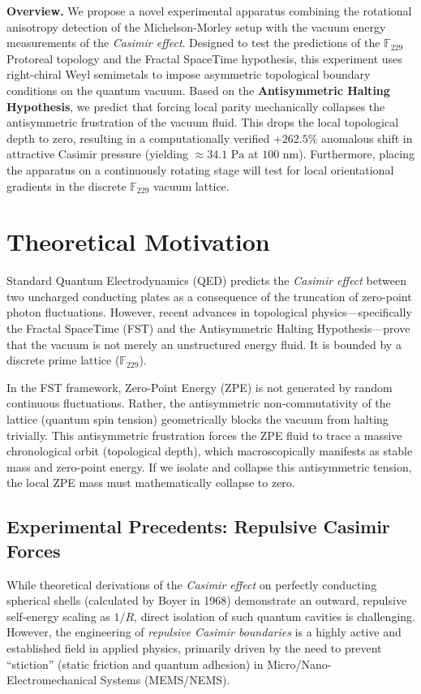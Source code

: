 \documentclass[12pt,oneside]{article}
\theoremstyle{principia}
\theoremstyle{definition}
\theoremstyle{remark}
\begin{document}
\vspace{1em}\noindent\textbf{Overview.}
We propose a novel experimental apparatus combining the rotational anisotropy detection of the Michelson-Morley setup with the vacuum energy measurements of the \emph{Casimir effect}. Designed to test the predictions of the $\mathbb{F}_{229}$ Protoreal topology and the Fractal SpaceTime hypothesis, this experiment uses right-chiral Weyl semimetals to impose asymmetric topological boundary conditions on the quantum vacuum. Based on the \textbf{Antisymmetric Halting Hypothesis}, we predict that forcing local parity mechanically collapses the antisymmetric frustration of the vacuum fluid. This drops the local topological depth to zero, resulting in a computationally verified $+262.5\%$ anomalous shift in attractive Casimir pressure (yielding $\approx 34.1\text{ Pa}$ at $100\text{ nm}$). Furthermore, placing the apparatus on a continuously rotating stage will test for local orientational gradients in the discrete $\mathbb{F}_{229}$ vacuum lattice.
\vspace{1em}


\section{Theoretical Motivation}\label{sec:theory}

Standard Quantum Electrodynamics (QED) predicts the \emph{Casimir effect} between two uncharged conducting plates as a consequence of the truncation of zero-point photon fluctuations. However, recent advances in topological physics---specifically the Fractal SpaceTime (FST) and the Antisymmetric Halting Hypothesis---prove that the vacuum is not merely an unstructured energy fluid. It is bounded by a discrete prime lattice ($\mathbb{F}_{229}$).

In the FST framework, Zero-Point Energy (ZPE) is not generated by random continuous fluctuations. Rather, the antisymmetric non-commutativity of the lattice (quantum spin tension) geometrically blocks the vacuum from halting trivially. This antisymmetric frustration forces the ZPE fluid to trace a massive chronological orbit (topological depth), which macroscopically manifests as stable mass and zero-point energy. If we isolate and collapse this antisymmetric tension, the local ZPE mass must mathematically collapse to zero.

\subsection{Experimental Precedents: Repulsive Casimir Forces}
While theoretical derivations of the \emph{Casimir effect} on perfectly conducting spherical shells (calculated by Boyer in 1968) demonstrate an outward, repulsive self-energy scaling as $1/R$, direct isolation of such quantum cavities is challenging. However, the engineering of \emph{repulsive Casimir boundaries} is a highly active and established field in applied physics, primarily driven by the need to prevent ``stiction'' (static friction and quantum adhesion) in Micro/Nano-Electromechanical Systems (MEMS/NEMS).
\end{document}
